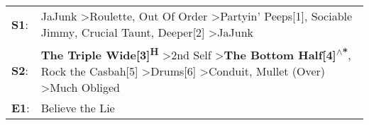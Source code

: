 \begin{supertabular}{p{0.03\textwidth}p{0.92\textwidth}}
 \textbf{S1}:  &                                                                       JaJunk\textsuperscript{} \textgreater \enspace Roulette\textsuperscript{}, \enspace Out Of Order\textsuperscript{} \textgreater \enspace Partyin' Peeps[1]\textsuperscript{}, \enspace Sociable Jimmy\textsuperscript{}, \enspace Crucial Taunt\textsuperscript{}, \enspace Deeper[2]\textsuperscript{} \textgreater \enspace JaJunk\textsuperscript{}  \enspace  \\
 \textbf{S2}:  &  \textbf{The Triple Wide[3]\textsuperscript{H}} \textgreater \enspace 2nd Self\textsuperscript{} \textgreater \enspace \textbf{The Bottom Half[4]\textsuperscript{$\wedge$*}}, \enspace Rock the Casbah[5]\textsuperscript{} \textgreater \enspace Drums[6]\textsuperscript{} \textgreater \enspace Conduit\textsuperscript{}, \enspace Mullet (Over)\textsuperscript{} \textgreater \enspace Much Obliged\textsuperscript{}  \enspace  \\
 \textbf{E1}:  &                                                                                                                                                                                                                                                                                                                                                                                            Believe the Lie\textsuperscript{}  \enspace  \\
\end{supertabular}
